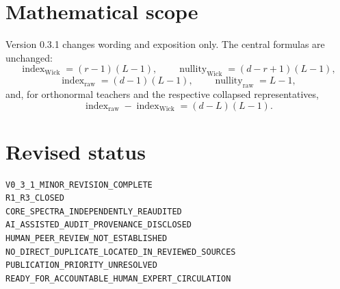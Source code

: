 \documentclass[11pt]{article}
\begin{document}
\section*{Mathematical scope}
Version 0.3.1 changes wording and exposition only.  The central formulas are unchanged:
\[
\operatorname{index}_{\mathrm{Wick}}=(r-1)(L-1),
\qquad
\operatorname{nullity}_{\mathrm{Wick}}=(d-r+1)(L-1),
\]
\[
\operatorname{index}_{\mathrm{raw}}=(d-1)(L-1),
\qquad
\operatorname{nullity}_{\mathrm{raw}}=L-1,
\]
and, for orthonormal teachers and the respective collapsed representatives,
\[
\operatorname{index}_{\mathrm{raw}}-\operatorname{index}_{\mathrm{Wick}}
=(d-L)(L-1).
\]

\section*{Revised status}
\begin{verbatim}
V0_3_1_MINOR_REVISION_COMPLETE
R1_R3_CLOSED
CORE_SPECTRA_INDEPENDENTLY_REAUDITED
AI_ASSISTED_AUDIT_PROVENANCE_DISCLOSED
HUMAN_PEER_REVIEW_NOT_ESTABLISHED
NO_DIRECT_DUPLICATE_LOCATED_IN_REVIEWED_SOURCES
PUBLICATION_PRIORITY_UNRESOLVED
READY_FOR_ACCOUNTABLE_HUMAN_EXPERT_CIRCULATION
\end{verbatim}
\end{document}
